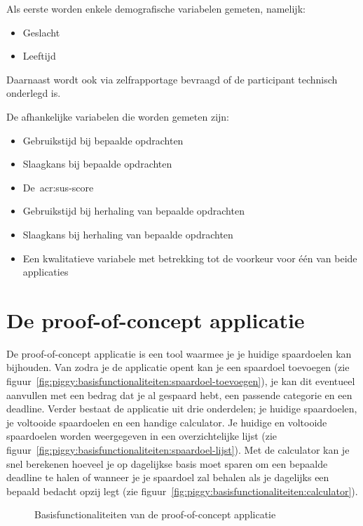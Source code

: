 Als eerste worden enkele demografische variabelen gemeten, namelijk:
\begin{itemize}
    \item Geslacht
    \item Leeftijd
\end{itemize}
Daarnaast wordt ook via zelfrapportage bevraagd of de participant technisch onderlegd is.

De afhankelijke variabelen die worden gemeten zijn:
\begin{itemize}
    \item Gebruikstijd bij bepaalde opdrachten
    \item Slaagkans bij bepaalde opdrachten
    \item De~\acrshort{acr:sus}-score
    \item Gebruikstijd bij herhaling van bepaalde opdrachten
    \item Slaagkans bij herhaling van bepaalde opdrachten
    \item Een kwalitatieve variabele met betrekking tot de voorkeur voor één van beide applicaties
\end{itemize}

\section{De proof-of-concept applicatie}
\label{sec:applicatie}

De proof-of-concept applicatie is een tool waarmee je je huidige spaardoelen kan bijhouden. Van zodra je de applicatie opent kan je een spaardoel toevoegen (zie figuur~\ref{fig:piggy:basisfunctionaliteiten:spaardoel-toevoegen}), je kan dit eventueel aanvullen met een bedrag dat je al gespaard hebt, een passende categorie en een deadline. Verder bestaat de applicatie uit drie onderdelen; je huidige spaardoelen, je voltooide spaardoelen en een handige calculator. Je huidige en voltooide spaardoelen worden weergegeven in een overzichtelijke lijst (zie figuur~\ref{fig:piggy:basisfunctionaliteiten:spaardoel-lijst}). Met de calculator kan je snel berekenen hoeveel je op dagelijkse basis moet sparen om een bepaalde deadline te halen of wanneer je je spaardoel zal behalen als je dagelijks een bepaald bedacht opzij legt (zie figuur~\ref{fig:piggy:basisfunctionaliteiten:calculator}).

\begin{figure}[h!]
    \centering
    \qquad
    \qquad
    \caption{Basisfunctionaliteiten van de proof-of-concept applicatie}
    \label{fig:piggy:basisfunctionaliteiten}
\end{figure}

